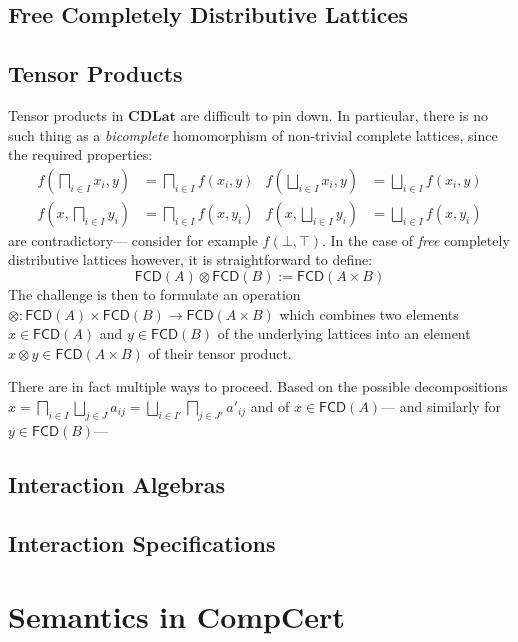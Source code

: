 \documentclass[sigplan,10pt,review,anonymous]{acmart}
\newcommand{\kw}[1]{\ensuremath{\mathsf{#1}}}
\begin{document}
\subsection{Free Completely Distributive Lattices}

\subsection{Tensor Products}

Tensor products in $\mathbf{CDLat}$
are difficult to pin down.
In particular,
there is no such thing as a \emph{bicomplete} homomorphism
of non-trivial complete lattices,
since the required properties:
\begin{align*}
  f \left( \bigsqcap_{i \in I} x_i, y \right) &=
    \bigsqcap_{i \in I} f(x_i, y) &
  f \left( \bigsqcup_{i \in I} x_i, y \right) &=
    \bigsqcup_{i \in I} f(x_i, y) \\
  f \left( x, \bigsqcap_{i \in I} y_i \right) &=
    \bigsqcap_{i \in I} f(x, y_i) &
  f \left( x, \bigsqcup_{i \in I} y_i \right) &=
    \bigsqcup_{i \in I} f(x, y_i)
\end{align*}
are contradictory---%
consider for example $f(\bot, \top)$.
In the case of \emph{free} completely distributive lattices however,
it is straightforward to define:
\[
  \kw{FCD}(A) \otimes \kw{FCD}(B) := \kw{FCD}(A \times B)
\]
The challenge is then to formulate an operation
${\otimes} : \kw{FCD}(A) \times \kw{FCD}(B) \rightarrow \kw{FCD}(A \times B)$
which combines two elements $x \in \kw{FCD}(A)$ and $y \in \kw{FCD}(B)$
of the underlying lattices
into an element $x \otimes y \in \kw{FCD}(A \times B)$
of their tensor product.

There are in fact multiple ways to proceed.
Based on the possible decompositions
$x = \bigsqcap_{i \in I} \bigsqcup_{j \in J} a_{ij}
   = \bigsqcup_{i \in I'} \bigsqcap_{j \in J'} a'_{ij}$ and
of $x \in \kw{FCD}(A)$---%
and similarly for $y \in \kw{FCD}(B)$---%


\subsection{Interaction Algebras}

\subsection{Interaction Specifications}


\section{Semantics in CompCert} %
\end{document}

